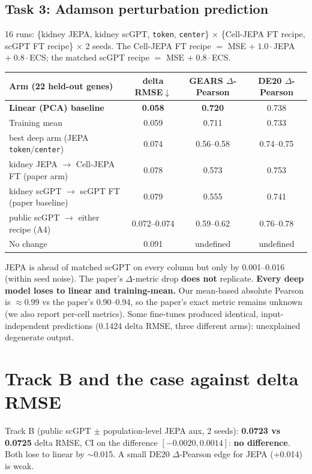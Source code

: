 \documentclass[11pt]{article}
\newcommand{\code}[1]{\texttt{\small #1}}
\newcommand{\down}{$\downarrow$}
\begin{document}
\subsection{Task 3: Adamson perturbation prediction}
16 runs: \{kidney JEPA, kidney scGPT, \code{token}, \code{center}\} $\times$ \{Cell-JEPA FT recipe, scGPT FT recipe\} $\times$ 2 seeds. The Cell-JEPA FT recipe $=$ MSE $+\;1.0\cdot$JEPA $+\;0.8\cdot$ECS; the matched scGPT recipe $=$ MSE $+\;0.8\cdot$ECS.
\begin{center}\small
\begin{tabular}{lccc}
\toprule
Arm (22 held-out genes) & delta RMSE\down & GEARS $\Delta$-Pearson & DE20 $\Delta$-Pearson\\
\midrule
\textbf{Linear (PCA) baseline} & \textbf{0.058} & \textbf{0.720} & 0.738\\
Training mean & 0.059 & 0.711 & 0.733\\
best deep arm (JEPA \code{token}/\code{center}) & 0.074 & 0.56--0.58 & 0.74--0.75\\
kidney JEPA $\to$ Cell-JEPA FT (paper arm) & 0.078 & 0.573 & 0.753\\
kidney scGPT $\to$ scGPT FT (paper baseline) & 0.079 & 0.555 & 0.741\\
public scGPT $\to$ either recipe (A4) & 0.072--0.074 & 0.59--0.62 & 0.76--0.78\\
No change & 0.091 & undefined & undefined\\
\bottomrule
\end{tabular}
\end{center}
JEPA is ahead of matched scGPT on every column but only by 0.001--0.016 (within seed noise). The paper's $\Delta$-metric drop \textbf{does not} replicate. \textbf{Every deep model loses to linear and training-mean.} Our mean-based absolute Pearson is $\approx 0.99$ vs the paper's 0.90--0.94, so the paper's exact metric remains unknown (we also report per-cell metrics). Some fine-tunes produced identical, input-independent predictions (0.1424 delta RMSE, three different arms): unexplained degenerate output.

\section{Track B and the case against delta RMSE}\label{sec:metrics}

Track B (public scGPT $\pm$ population-level JEPA aux, 2 seeds): \textbf{0.0723 vs 0.0725} delta RMSE, CI on the difference $[-0.0020, 0.0014]$: \textbf{no difference}. Both lose to linear by $\sim$0.015. A small DE20 $\Delta$-Pearson edge for JEPA (+0.014) is weak.
\end{document}
